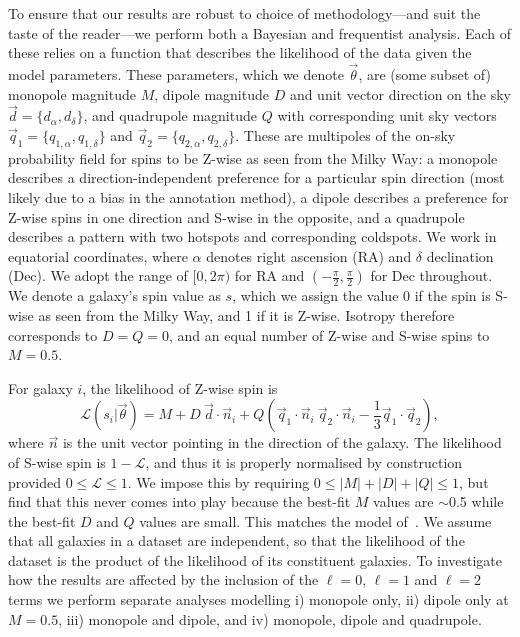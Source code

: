 \documentclass[fleqn,usenatbib,nofootinbib]{mnras}
\begin{document}
To ensure that our results are robust to choice of methodology---and suit the taste of the reader---we perform both a Bayesian and frequentist analysis. Each of these relies on a function that describes the likelihood of the data given the model parameters. These parameters, which we denote $\vec{\theta}$, are (some subset of) monopole magnitude $M$, dipole magnitude $D$ and unit vector direction on the sky $\vec{d} = \{d_\alpha, d_\delta\}$, and quadrupole magnitude $Q$ with corresponding unit sky vectors $\vec{q}_1 = \{q_{1,\alpha}, q_{1,\delta}\}$ and $\vec{q}_2 = \{q_{2,\alpha}, q_{2,\delta}\}$. These are multipoles of the on-sky probability field for spins to be Z-wise as seen from the Milky Way: a monopole describes a direction-independent preference for a particular spin direction (most likely due to a bias in the annotation method), a dipole describes a preference for Z-wise spins in one direction and S-wise in the opposite, and a quadrupole describes a pattern with two hotspots and corresponding coldspots. We work in equatorial coordinates, where $\alpha$ denotes right ascension (RA) and $\delta$ declination (Dec). We adopt the range of $[0, 2\pi)$ for RA and $(-\frac{\pi}{2}, \frac{\pi}{2})$ for Dec throughout. We denote a galaxy's spin value as $s$, which we assign the value 0 if the spin is S-wise as seen from the Milky Way, and 1 if it is Z-wise. Isotropy therefore corresponds to $D=Q=0$, and an equal number of Z-wise and S-wise spins to $M=0.5$.

For galaxy $i$, the likelihood of Z-wise spin is
\begin{equation}\label{eq:L}
\mathcal{L}(s_i|\vec{\theta}) = M + D \: \vec{d} \cdot \vec{n}_i + Q \left(\vec{q}_1 \cdot \vec{n}_i \: \vec{q}_2 \cdot \vec{n}_i - \frac{1}{3} \vec{q}_1 \cdot \vec{q}_2\right),
\end{equation}
where $\vec{n}$ is the unit vector pointing in the direction of the galaxy. The likelihood of S-wise spin is $1-\mathcal{L}$, and thus it is properly normalised by construction provided $0 \le \mathcal{L} \le 1$. We impose this by requiring $0 \le |M|+|D|+|Q| \le 1$, but find that this never comes into play because the best-fit $M$ values are $\sim$0.5 while the best-fit $D$ and $Q$ values are small.
This matches the model of~\citet{Land}.
We assume that all galaxies in a dataset are independent, so that the likelihood of the dataset is the product of the likelihood of its constituent galaxies.
To investigate how the results are affected by the inclusion of the $\ell=0$, $\ell=1$ and $\ell=2$ terms we perform separate analyses modelling i) monopole only, ii) dipole only at $M=0.5$, iii) monopole and dipole, and iv) monopole, dipole and quadrupole.
\end{document}
